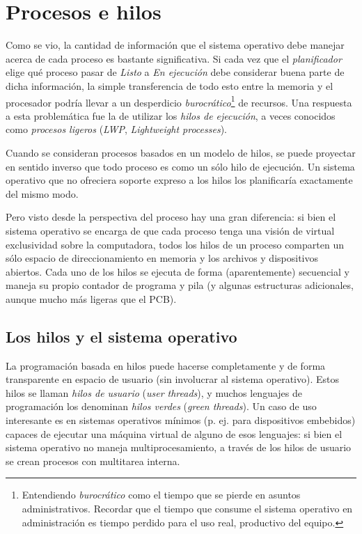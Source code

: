 \documentclass[11pt,fleqn]{book} %
\begin{document}
\section{Procesos e hilos}
\label{sec-3-2}


Como se vio, la cantidad de información que el sistema operativo debe
manejar acerca de cada proceso es bastante significativa. Si cada vez
que el \emph{planificador} elige qué proceso pasar de \emph{Listo} a \emph{En ejecución} debe considerar buena parte de dicha información, la simple
transferencia de todo esto entre la memoria y el procesador podría
llevar a un desperdicio \emph{burocrático}\footnote{Entendiendo \emph{burocrático}
como el tiempo que se pierde en asuntos administrativos. Recordar
que el tiempo que consume el sistema operativo en administración es
tiempo perdido para el uso real, productivo del equipo. } de
recursos. Una respuesta a esta problemática fue la de utilizar los
\emph{hilos de ejecución}, a veces conocidos como \emph{procesos ligeros}
(\emph{LWP}, \emph{Lightweight processes}).

Cuando se consideran procesos basados en un modelo de hilos, se puede
proyectar en sentido inverso que todo proceso es como un sólo hilo de
ejecución. Un sistema operativo que no ofreciera soporte expreso a los
hilos los planificaría exactamente del mismo modo.

Pero visto desde la perspectiva del proceso hay una gran diferencia:
si bien el sistema operativo se encarga de que cada proceso tenga una
visión de virtual exclusividad sobre la computadora, todos los hilos
de un proceso comparten un sólo espacio de direccionamiento en memoria
y los archivos y dispositivos abiertos. Cada uno
de los hilos se ejecuta de forma (aparentemente) secuencial y maneja
su propio contador de programa y pila (y algunas estructuras adicionales,
aunque mucho más ligeras que el PCB).
\subsection{Los hilos y el sistema operativo}
\label{sec-3-2-1}
\label{PROC_tipos_de_hilos}


La programación basada en hilos puede hacerse
completamente y de forma transparente en espacio de usuario (sin
involucrar al sistema operativo). Estos hilos se llaman \emph{hilos de usuario} (\emph{user threads}), y muchos lenguajes de programación los
denominan \emph{hilos verdes} (\emph{green threads}). Un caso de uso interesante
es en sistemas operativos mínimos (p. ej. para dispositivos embebidos)
capaces de ejecutar una máquina virtual de alguno de esos lenguajes:
si bien el sistema operativo no maneja multiprocesamiento, a través de
los hilos de usuario se crean procesos con multitarea interna.
\end{document}
